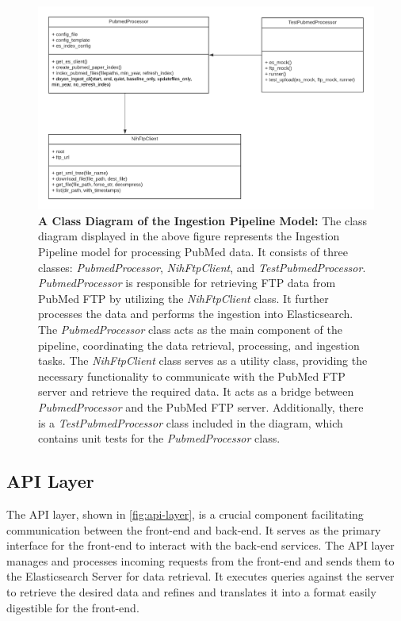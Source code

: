 \begin{figure}[htp]
    \centering
    \includegraphics[width=\textwidth]{Images/IngestionPipeline_ClassDiagram.png}    
    \caption[A Class Diagram of the Ingestion Pipeline Model]{\textbf{A Class Diagram of the Ingestion Pipeline Model:} The class diagram displayed in the above figure represents the Ingestion Pipeline model for processing PubMed data. It consists of three classes: \emph{PubmedProcessor}, \emph{NihFtpClient}, and \emph{TestPubmedProcessor}. \emph{PubmedProcessor} is responsible for retrieving FTP data from PubMed FTP by utilizing the \emph{NihFtpClient} class. It further processes the data and performs the ingestion into Elasticsearch. The \emph{PubmedProcessor} class acts as the main component of the pipeline, coordinating the data retrieval, processing, and ingestion tasks. The \emph{NihFtpClient} class serves as a utility class, providing the necessary functionality to communicate with the PubMed FTP server and retrieve the required data. It acts as a bridge between \emph{PubmedProcessor} and the PubMed FTP server. Additionally, there is a \emph{TestPubmedProcessor} class included in the diagram, which contains unit tests for the \emph{PubmedProcessor} class.}
    \label{fig:ingestion}
\end{figure}



\subsection{API Layer}

The API layer, shown in \autoref{fig:api-layer}, is a crucial component facilitating communication between the front-end and back-end. It serves as the primary interface for the front-end to interact with the back-end services. The API layer manages and processes incoming requests from the front-end and sends them to the Elasticsearch Server for data retrieval. It executes queries against the server to retrieve the desired data and refines and translates it into a format easily digestible for the front-end. 

